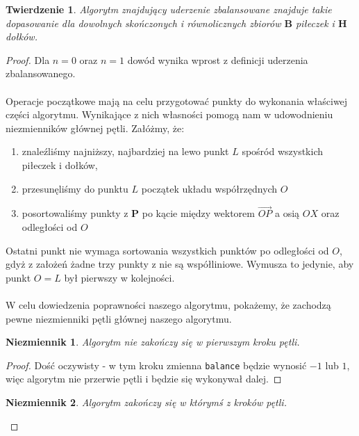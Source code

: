 \documentclass[10pt,a4paper]{article}
\newtheorem{theorem}{Twierdzenie}
\newtheorem{invariant}{Niezmiennik}
\begin{document}
	\vspace{2em}

	\begin{theorem} \label{theorem:1}
		Algorytm znajdujący uderzenie zbalansowane znajduje takie dopasowanie dla dowolnych skończonych i równolicznych zbiorów $\mathbf{B}$ piłeczek i $\mathbf{H}$ dołków.
	\end{theorem}

	\begin{proof}
		Dla $n = 0$ oraz $n = 1$ dowód wynika wprost z definicji uderzenia zbalansowanego. \\~\\
		Operacje początkowe mają na celu przygotować punkty do wykonania właściwej części algorytmu. Wynikające z nich własności pomogą nam w udowodnieniu niezmienników głównej pętli. Załóżmy, że:
		\begin{enumerate}
			\item znaleźliśmy najniższy, najbardziej na lewo punkt $L$ spośród wszystkich piłeczek i dołków, 
			\item przesunęliśmy do punktu $L$ początek układu współrzędnych $O$
			\item posortowaliśmy punkty z $\mathbf{P}$ po kącie między wektorem $\overrightarrow{OP}$ a osią $OX$ oraz odległości od $O$
		\end{enumerate}
		Ostatni punkt nie wymaga sortowania wszystkich punktów po odległości od $O$, gdyż z założeń żadne trzy punkty z nie są współliniowe. Wymusza to jedynie, aby punkt $O = L$ był pierwszy w kolejności. \\~\\
		W celu dowiedzenia poprawności naszego algorytmu, pokażemy, że zachodzą pewne niezmienniki pętli głównej naszego algorytmu.

		\begin{addmargin}[1.25em]{0em}
			\begin{invariant} \label{invariant:1}
				Algorytm nie zakończy się w pierwszym kroku pętli.
			\end{invariant}
			
			\begin{proof}
				Dość oczywisty - w tym kroku zmienna \texttt{balance} będzie wynosić $-1$ lub $1$, więc algorytm nie przerwie pętli i będzie się wykonywał dalej. 
			\end{proof}
			
			\vspace{1em}
			
			\begin{invariant} \label{invariant:2}
				Algorytm zakończy się w którymś z kroków pętli.
			\end{invariant}
			

\end{addmargin}
\end{proof}
\end{document}
